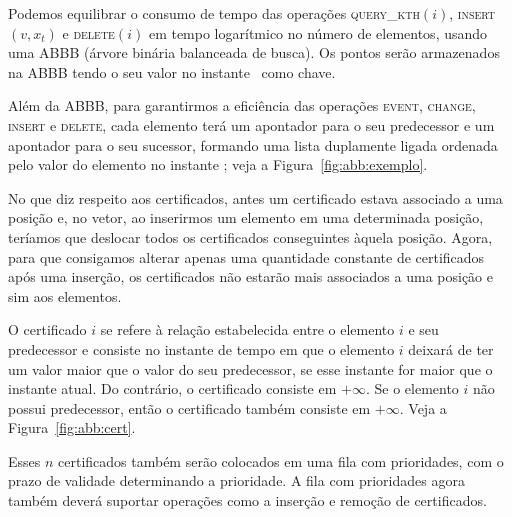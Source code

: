Podemos equilibrar o consumo de tempo das operações
\textsc{query\_kth}$(i)$, \textsc{insert}$(v, x_t)$ e
\textsc{delete}$(i)$ em tempo logarítmico no número de elementos,
usando uma ABBB (árvore binária balanceada de busca).
Os pontos serão armazenados na ABBB tendo o seu valor no instante \now~como
chave.

Além da ABBB, para garantirmos a eficiência das operações
\textsc{event}, \textsc{change}, \textsc{insert} e \textsc{delete},
cada elemento terá um apontador para o seu predecessor e um
apontador para o seu sucessor, formando uma lista duplamente ligada
ordenada pelo valor do elemento no instante \now; veja a Figura~\ref{fig:abb:exemplo}.



No que diz respeito aos certificados, antes um certificado estava
associado a uma posição e, no vetor, ao inserirmos um elemento em
uma determinada posição, teríamos que deslocar %
todos os certificados conseguintes àquela posição.
Agora, para que consigamos alterar apenas uma quantidade constante de certificados
após uma inserção, os certificados não estarão mais associados a uma
posição e sim aos elementos.

O certificado $i$ se refere à relação estabelecida entre o elemento
$i$ e seu predecessor e consiste no instante de tempo em que o
elemento $i$ deixará de ter um valor maior que o valor do seu
predecessor, se esse instante for maior que o instante atual.
Do contrário, o certificado consiste em $+\infty$.
Se o elemento $i$ não possui predecessor, então o certificado também consiste em
$+\infty$.
Veja a Figura~\ref{fig:abb:cert}.



Esses $n$ certificados também serão colocados em uma fila com
prioridades, com o prazo de validade determinando a prioridade.
A fila com prioridades agora também deverá suportar operações
como a inserção e remoção de certificados.

